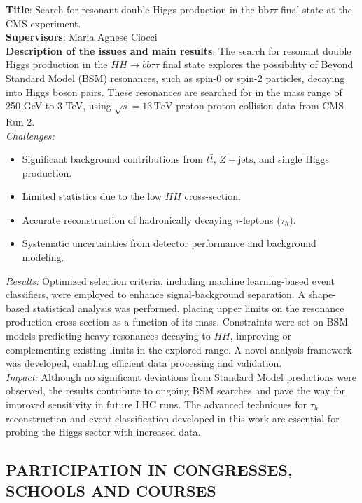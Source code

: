 \documentclass[12pt,a4paper,oneside]{extarticle}
\begin{document}
\textbf{Title}: Search for resonant double Higgs production in the bb$\tau\tau$ final state at the CMS experiment.
\\
\textbf{Supervisors}: Maria Agnese Ciocci
\\
\textbf{Description of the issues and main results}:
The search for resonant double Higgs production in the $HH \to b\bar{b}\tau\tau$ final state explores the possibility of Beyond Standard Model (BSM) resonances, such as spin-0 or spin-2 particles, decaying into Higgs boson pairs. These resonances are searched for in the mass range of 250 GeV to 3 TeV, using $ \sqrt{s} = 13\,\textrm{TeV} $ proton-proton collision data from CMS Run 2.\\
\textit{Challenges:}
\begin{itemize}
    \item Significant background contributions from $t\bar{t}$, $Z + \textrm{jets}$, and single Higgs production.
    \item Limited statistics due to the low $HH$ cross-section.
    \item Accurate reconstruction of hadronically decaying $\tau$-leptons ($\tau_h$).
    \item Systematic uncertainties from detector performance and background modeling.
\end{itemize}
\noindent \textit{Results:}
Optimized selection criteria, including machine learning-based event classifiers, were employed to enhance signal-background separation. A shape-based statistical analysis was performed, placing upper limits on the resonance production cross-section as a function of its mass. Constraints were set on BSM models predicting heavy resonances decaying to $HH$, improving or complementing existing limits in the explored range. A novel analysis framework was developed, enabling efficient data processing and validation.\\ %
\textit{Impact:}
Although no significant deviations from Standard Model predictions were observed, the results contribute to ongoing BSM searches and pave the way for improved sensitivity in future LHC runs. The advanced techniques for $\tau_h$ reconstruction and event classification developed in this work are essential for probing the Higgs sector with increased data.

\subsection*{PARTICIPATION IN CONGRESSES, SCHOOLS AND COURSES}
\end{document}
